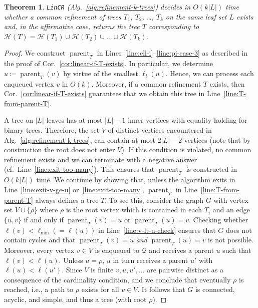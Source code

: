 \documentclass[11pt]{article}
\newtheorem{theorem}{Theorem}[section]
\newcommand{\parent}{\operatorname{parent}}
\newcommand{\HH}{\mathcal{H}}
\begin{document}
\begin{theorem}
  \texttt{LinCR} (Alg.~\ref{alg:refinement-k-trees}) decides in $O(k|L|)$
  time whether a common refinement of trees $T_1$, $T_2$, \dots, $T_k$ on
  the same leaf set $L$ exists and, in the affirmative case, returns the
  tree $T$ corresponding to
  $\HH(T)=\HH(T_1)\cup\HH(T_2)\cup\dots\cup\HH(T_k)$.
\end{theorem}
\begin{proof}
  We construct $\parent_{T}$ in
  Lines~\ref{line:ell-i}--\ref{line:pi-case-3} as described in the proof of
  Cor.~\ref{cor:linear-if-T-exists}. In particular, we determine
  $u\coloneqq\parent_T(v)$ by virtue of the smallest $\ell_i(u)$.  Hence,
  we can process each enqueued vertex $v$ in $O(k)$.  Moreover, if a common
  refinement $T$ exists, then Cor.~\ref{cor:linear-if-T-exists} guarantees
  that we obtain this tree in Line~\ref{line:T-from-parent-T}.
  
  A tree on $|L|$ leaves has at most $|L|-1$ inner vertices with equality
  holding for binary trees.  Therefore, the set $V$ of distinct vertices
  encountered in Alg.~\ref{alg:refinement-k-trees}, can contain at most
  $2|L|-2$ vertices (note that by construction the root does not enter
  $V$).  If this condition is violated, no common refinement exists and we
  can terminate with a negative answer (cf.\
  Line~\ref{line:exit-too-many}). This ensures that $\parent_{T}$ is
  constructed in $O(k|L|)$ time.  We continue by showing that, unless the
  algorithm exits in Line~\ref{line:exit-v-ge-u}
  or~\ref{line:exit-too-many}, $\parent_{T}$ in
  Line~\ref{line:T-from-parent-T} always defines a tree $T$. To see this,
  consider the graph $G$ with vertex set $V\cup\{\rho\}$ where $\rho$ is
  the root vertex which is contained in each $T_i$ and an edge $\{u,v\}$ if
  and only if $\parent_{T}(v)=u$ or $\parent_{T}(u)=v$.  Checking whether
  $\ell(v)<\ell_{\min}(=\ell(u))$ in Line~\ref{line:v-lt-u-check} ensures
  that $G$ does not contain cycles and that $\parent_{T}(v)=u$ \emph{and}
  $\parent_{T}(u)=v$ is not possible.  Moreover, every vertex $v\in V$ is
  enqueued to $\mathcal{Q}$ and receives a parent $u$ such that
  $\ell(v)<\ell(u)$.  Unless $u=\rho$, $u$ in turn receives a parent $u'$
  with $\ell(u)<\ell(u')$.  Since $V$ is finite $v,u,u',...$ are pairwise
  distinct as a consequence of the cardinality condition, and we conclude
  that eventually $\rho$ is reached, i.e., a path to $\rho$ exists for all
  $v\in V$.  It follows that $G$ is connected, acyclic, and simple, and
  thus a tree (with root $\rho$).
  

\end{proof}
\end{document}
